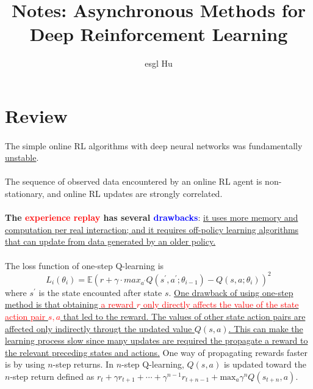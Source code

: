 \documentclass[12pt,a4paper]{article}
\begin{document}
\title{Notes: Asynchronous Methods for Deep Reinforcement Learning\cite{MnihBMGLHSK16}}
\author{esgl Hu}
\maketitle
\section{Review}
\paragraph{}The simple online RL algorithms with deep neural networks was fundamentally \uline{unstable}.
\paragraph{}The sequence of observed data encountered by an online RL agent is non-stationary, and online RL updates are strongly correlated.
\paragraph{}\textbf{The \textcolor{red}{experience replay} has several \textcolor{blue}{drawbacks}}: \uline{it uses more memory and computation per real interaction; and it requires off-policy learning algorithms that can update from data generated by an older policy.}
\paragraph{} The loss function of one-step Q-learning is 
\begin{equation}\label{loss_function_one_step_q_learning}
L_{i}(\theta_{i}) = \mathbb{E}(r + \gamma\cdot max_{a^{'}}Q(s^{'}, a^{'}; \theta_{i-1}) - Q(s, a; \theta_{i}))^{2}
\end{equation}
where $s^{'}$ is the state encounted after state $s$. \uline{One drawback of using one-step method is that obtaining \textcolor{red}{a reward $r$ only directly affects the value of the state action pair $s, a$ }that led to the reward. The values of other state action pairs are affected only indirectly througt the updated value $Q(s, a)$. This can make the learning process slow since many updates are required the propagate a reward to the relevant preceding states and actions.} One way of propagating rewards faster is by using $n$-step returns. In $n$-step Q-learning, $Q(s, a)$ is updated toward the $n$-step return defined as \uline{$r_{t} + \gamma r_{t+1} + \cdots + \gamma^{n-1}r_{t+n-1} + \text{max}_{a}\gamma^{n}Q(s_{t+n}, a)$}.
\end{document}
